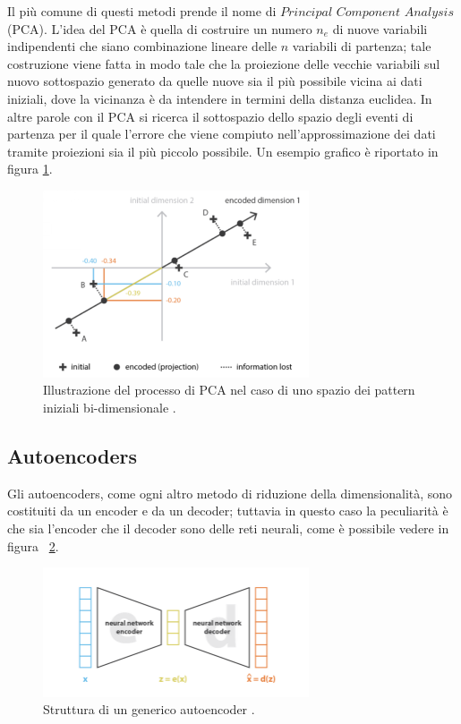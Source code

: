 Il più comune di questi metodi prende il nome di $\textit{Principal Component Analysis}$ (PCA). L'idea del PCA è quella di costruire un numero $\textit{n}_\textit{e}$ di nuove variabili indipendenti che siano combinazione lineare delle $\textit{n}$ variabili di partenza; tale costruzione viene fatta in modo tale che la proiezione delle vecchie variabili sul nuovo sottospazio generato da quelle nuove sia il più possibile vicina ai dati iniziali, dove la vicinanza è da intendere in termini della distanza euclidea. In altre parole con il PCA si ricerca il sottospazio dello spazio degli eventi di partenza per il quale l'errore che viene compiuto nell'approssimazione dei dati tramite proiezioni sia il più piccolo possibile. Un esempio grafico è riportato in figura \ref{PCA}.
\begin{figure}[h!]
	\centering
	\includegraphics[width=0.70\textwidth]{figs/PCA.png}
	\caption{Illustrazione del processo di PCA nel caso di uno spazio dei pattern iniziali bi-dimensionale \cite{Understanding_VAEs}.}
	\label{PCA}
\end{figure}

\newpage


\subsection{Autoencoders}
\label{autoencoders}

Gli autoencoders, come ogni altro metodo di riduzione della dimensionalità, sono costituiti da un encoder e da un decoder; tuttavia in questo caso la peculiarità è che sia l'encoder che il decoder sono delle reti neurali, come è possibile vedere in figura ~\ref{autoencoder}. 

\begin{figure}[h!]
	\centering
	\includegraphics[width=0.70\textwidth]{figs/autoencoder.png}
	\caption{Struttura di un generico autoencoder \cite{Understanding_VAEs}.}
	\label{autoencoder}
\end{figure}

